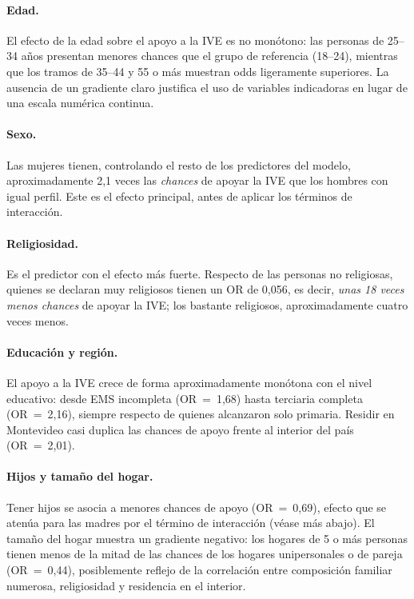 \documentclass[11pt,a4paper]{article}
\begin{document}
\paragraph{Edad.} El efecto de la edad sobre el apoyo a la IVE es no monótono: las personas de 25--34 años presentan menores chances que el grupo de referencia (18--24), mientras que los tramos de 35--44 y 55 o más muestran odds ligeramente superiores. La ausencia de un gradiente claro justifica el uso de variables indicadoras en lugar de una escala numérica continua.

\paragraph{Sexo.} Las mujeres tienen, controlando el resto de los predictores del modelo, aproximadamente 2,1 veces las \textit{chances} de apoyar la IVE que los hombres con igual perfil. Este es el efecto principal, antes de aplicar los términos de interacción.

\paragraph{Religiosidad.} Es el predictor con el efecto más fuerte. Respecto de las personas no religiosas, quienes se declaran muy religiosos tienen un OR de 0,056, es decir, \emph{unas 18 veces menos chances} de apoyar la IVE; los bastante religiosos, aproximadamente cuatro veces menos.

\paragraph{Educación y región.} El apoyo a la IVE crece de forma aproximadamente monótona con el nivel educativo: desde EMS incompleta (OR~=~1,68) hasta terciaria completa (OR~=~2,16), siempre respecto de quienes alcanzaron solo primaria. Residir en Montevideo casi duplica las chances de apoyo frente al interior del país (OR~=~2,01).

\paragraph{Hijos y tamaño del hogar.} Tener hijos se asocia a menores chances de apoyo (OR~=~0,69), efecto que se atenúa para las madres por el término de interacción (véase más abajo). El tamaño del hogar muestra un gradiente negativo: los hogares de 5 o más personas tienen menos de la mitad de las chances de los hogares unipersonales o de pareja (OR~=~0,44), posiblemente reflejo de la correlación entre composición familiar numerosa, religiosidad y residencia en el interior.
\end{document}
